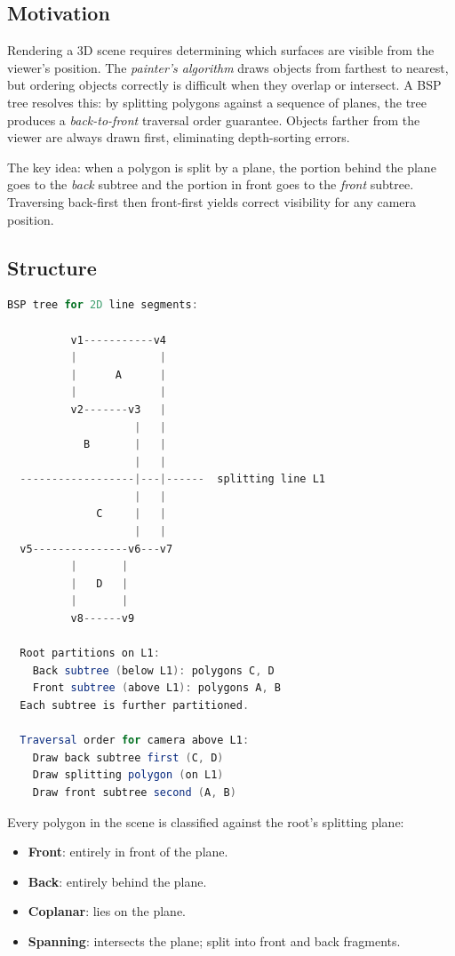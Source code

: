 \subsection{Motivation}

Rendering a 3D scene requires determining which surfaces are visible from the viewer's position. The \emph{painter's algorithm} draws objects from farthest to nearest, but ordering objects correctly is difficult when they overlap or intersect. A BSP tree resolves this: by splitting polygons against a sequence of planes, the tree produces a \emph{back-to-front} traversal order guarantee. Objects farther from the viewer are always drawn first, eliminating depth-sorting errors.

The key idea: when a polygon is split by a plane, the portion behind the plane goes to the \emph{back} subtree and the portion in front goes to the \emph{front} subtree. Traversing back-first then front-first yields correct visibility for any camera position.

\subsection{Structure}

\begin{center}
\begin{lstlisting}[language=Java]
  BSP tree for 2D line segments:

          v1-----------v4
          |             |
          |      A      |
          |             |
          v2-------v3   |
                    |   |
            B       |   |
                    |   |
  ------------------|---|------  splitting line L1
                    |   |
              C     |   |
                    |   |
  v5---------------v6---v7
          |       |
          |   D   |
          |       |
          v8------v9

  Root partitions on L1:
    Back subtree (below L1): polygons C, D
    Front subtree (above L1): polygons A, B
  Each subtree is further partitioned.

  Traversal order for camera above L1:
    Draw back subtree first (C, D)
    Draw splitting polygon (on L1)
    Draw front subtree second (A, B)
\end{lstlisting}
\end{center}

Every polygon in the scene is classified against the root's splitting plane:
\begin{itemize}
  \item \textbf{Front}: entirely in front of the plane.
  \item \textbf{Back}: entirely behind the plane.
  \item \textbf{Coplanar}: lies on the plane.
  \item \textbf{Spanning}: intersects the plane; split into front and back fragments.
\end{itemize}

